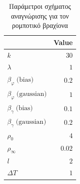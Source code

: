 {\begin{table}
		\centering
		\captionsetup{format=plain}
		\caption{Παράμετροι σχήματος αναγνώρισης για τον ρομποτικό βραχίονα}
		\label{tab:2dof_schema_params}
		\begin{tabular}{ l | r }
			\hline\hline
			\text{Parameter} & Value \\ \hline\hline
			$k$             & $30$   \\ \hline
			$\lambda$       & $1 $   \\ \hline
			$\beta_{\varphi} \;\text{(bias)}$     & $0.2$ \\ \hline
			$\beta_{\varphi} \;\text{(gaussian)}$ & $1$ \\ \hline
			$\beta_{\gamma} \;\text{(bias)}$     & $0.1$ \\ \hline
			$\beta_{\gamma} \;\text{(gaussian)}$ & $0.2$ \\ \hline
			$\rho_0      $ & $4$  \\ \hline
			$\rho_\infty $ & $0.02$  \\ \hline
			$l           $ & $2$  \\ \hline
			$\textit{ΔΤ} $  & $1$ 	\\ \hline \hline	
		\end{tabular}
	\end{table}

}
